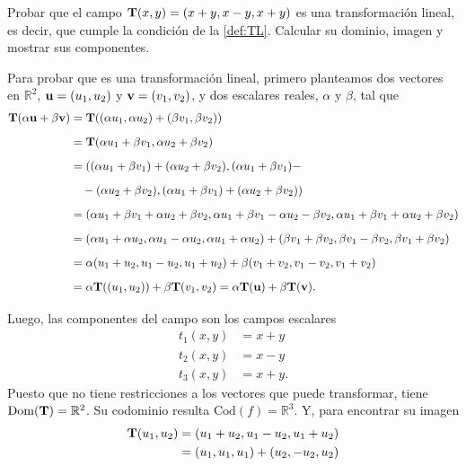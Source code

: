     \begin{example}
    Probar que el campo $\campoVec{T}(x,y) = (x+y,x-y,x+y)$  es una transformaci\'on lineal, es decir, que cumple  la condici\'on de la \autoref{def:TL}. Calcular su dominio, imagen y mostrar sus componentes.
    
    Para probar que es una transformación lineal, primero planteamos dos vectores en $\mathbb{R}^2$, $\vect{u}=(u_1,u_2)$ y
    $\vect{v}=(v_1,v_2)$, y dos escalares reales, $\alpha$ y $\beta$, tal que
    \begin{align*}
      \campoVec{T}(\alpha\vect{u}+\beta\vect{v})&=\campoVec{T}((\alpha u_1,\alpha u_2)+(\beta v_1, \beta v_2))\\[.2cm]
      &=\campoVec{T}(\alpha u_1+\beta v_1,\alpha u_2 + \beta v_2)\\[.2cm]
      &= ((\alpha u_1+\beta v_1)+(\alpha u_2 + \beta v_2),(\alpha u_1+\beta v_1)-\\[.2cm]
      &\quad-(\alpha u_2 + \beta v_2),(\alpha u_1+\beta v_1)+(\alpha u_2 + \beta v_2))\\[.2cm]
      &= (\alpha u_1+\beta v_1+\alpha u_2+\beta v_2, \alpha u_1+\beta v_1 - \alpha u_2-\beta v_2, \alpha u_1+\beta v_1+\alpha u_2+\beta v_2)\\[.2cm]
      &= (\alpha u_1+\alpha u_2, \alpha u_1 - \alpha u_2,\alpha u_1+\alpha u_2) + (\beta v_1+\beta v_2, \beta v_1 - \beta v_2,\beta v_1+\beta v_2)\\[.2cm]
      &= \alpha  (u_1+u_2,u_1-u_2,u_1+u_2) + \beta  (v_1+v_2,v_1-v_2,v_1+v_2)\\[.2cm]
      &= \alpha  \campoVec{t}((u_1,u_2)) + \beta  \campoVec{T}(v_1,v_2)=\alpha  \campoVec{T}(\vect{u}) + \beta  \campoVec{T}(\vect{v}).\\[.2cm]
    \end{align*}
    Luego, las componentes del campo son los campos escalares
    \begin{align*}
      t_1(x,y)&=x+y\\
      t_2(x,y)&=x-y\\
      t_3(x,y)&=x+y.
    \end{align*}
    Puesto que no tiene restricciones a los vectores que puede transformar, tiene $\text{Dom}(\campoVec{T})=\mathbb{R}^2$. Su codominio resulta $\text{Cod}(f)=\mathbb{R}^3$.
    Y, para encontrar su imagen
    \begin{align*}
      \campoVec{T}(u_1,u_2)&=(u_1+u_2,u_1-u_2,u_1+u_2)\\
      &=(u_1,u_1,u_1)+(u_2,-u_2,u_2)\\

\end{align*}
\end{example}
